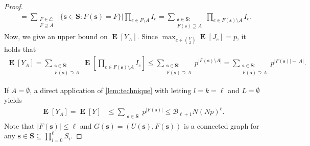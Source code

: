 \documentclass[letterpaper,11pt]{article}
\newcommand{\Ind}{I}
\newcommand{\Vsize}{N}
\newcommand{\pmax}{p}
\newcommand{\Slc}{\mathbf{S}}
\newcommand{\Vs}{U}
\newcommand{\Es}{F}
\DeclareMathOperator{\E}{\mathbf{E}}
\begin{document}
\begin{proof}
\begin{align*}
&=\sum_{\substack{\Es\in \mathcal{E}:\\F\supseteq A}} |\{\mathbf{s}\in \Slc:  \Es(\mathbf{s})=F\}|\prod_{e\in \Es\setminus A}\Ind_e
=\sum_{\substack{\mathbf{s}\in \Slc:\\ \Es(\mathbf{s}) \supseteq A}}\prod_{e\in \Es(\mathbf{s})\setminus A}\Ind_e.
\end{align*}
Now, we give an upper bound on $\E[Y_{A}]$. %
Since $\max_{e\in \binom{V}{2}}\E[J_e]=p$,
it holds that
\begin{align*}
\E[Y_{A}]=\sum_{\substack{\mathbf{s}\in \Slc:\\ \Es(\mathbf{s}) \supseteq A}}\E\left[\prod_{e\in \Es(\mathbf{s})\setminus A}\Ind_e\right]
\leq \sum_{\substack{\mathbf{s}\in \Slc:\\ \Es(\mathbf{s}) \supseteq A}}p^{|\Es(\mathbf{s})\setminus A|}
=\sum_{\substack{\mathbf{s}\in \Slc:\\ \Es(\mathbf{s}) \supseteq A}}p^{|\Es(\mathbf{s})|-|A|}.
\end{align*}

If $A=\emptyset$, 
a direct application of \cref{lem:technique} with letting $l=k=\ell$ and $L=\emptyset$ yields
\begin{align}
\E[Y_{A}]=\E[Y]
&\leq \sum_{\substack{\mathbf{s}\in \Slc}}p^{|\Es(\mathbf{s})|}
\leq \mathcal{B}_{\ell+1}\Vsize (\Vsize \pmax)^{\ell}.
\label{eq:YAzero}
\end{align}
Note that $|\Es(\mathbf{s})|\leq \ell$ and $G({\mathbf{s}})=(\Vs(\mathbf{s}),\Es(\mathbf{s}))$ is a connected graph for any $\mathbf{s}\in \Slc\subseteq \prod_{i=0}^\ell S_i$.


\end{proof}
\end{document}
